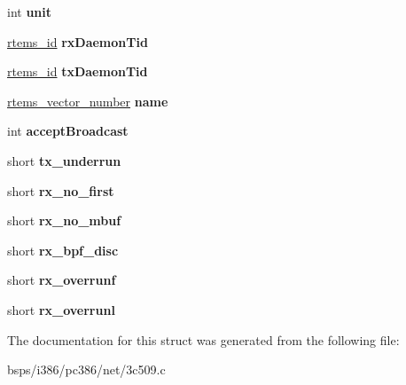 \begin{DoxyCompactItemize}
int {\bfseries unit}
\item 
\mbox{\label{structep__softc_a9312cff1f9c72f3cd36fba9ff84060f1}} 
\mbox{\hyperlink{group__ClassicTasks_gab20892b814dced7dd4e5b9bf42becd57}{rtems\+\_\+id}} {\bfseries rx\+Daemon\+Tid}
\item 
\mbox{\label{structep__softc_a6ae1c20341a00b1c6193d1e1e1aec3d4}} 
\mbox{\hyperlink{group__ClassicTasks_gab20892b814dced7dd4e5b9bf42becd57}{rtems\+\_\+id}} {\bfseries tx\+Daemon\+Tid}
\item 
\mbox{\label{structep__softc_a0ae1631a86900e353666d04e1480dda5}} 
\mbox{\hyperlink{group__ClassicINTR_ga3e434c197d99f128e78cae4d9358bd8b}{rtems\+\_\+vector\+\_\+number}} {\bfseries name}
\item 
\mbox{\label{structep__softc_af455c8a3900a4faeee5fc7903b1b10f5}} 
int {\bfseries accept\+Broadcast}
\item 
\mbox{\label{structep__softc_aae0d1ae24d23fe6b7633f567c977a359}} 
short {\bfseries tx\+\_\+underrun}
\item 
\mbox{\label{structep__softc_a5802aefc65ad704ba3d406cbb27b3261}} 
short {\bfseries rx\+\_\+no\+\_\+first}
\item 
\mbox{\label{structep__softc_a93d489a860df764881fcb7f5ed2d3e57}} 
short {\bfseries rx\+\_\+no\+\_\+mbuf}
\item 
\mbox{\label{structep__softc_a4253aeb7366f1e916650decc524c6bb5}} 
short {\bfseries rx\+\_\+bpf\+\_\+disc}
\item 
\mbox{\label{structep__softc_a8f67746cc1c6c3db2443db2f72e9918b}} 
short {\bfseries rx\+\_\+overrunf}
\item 
\mbox{\label{structep__softc_aa70d095f534cc7eded75d6d69f70bdce}} 
short {\bfseries rx\+\_\+overrunl}
\end{DoxyCompactItemize}


The documentation for this struct was generated from the following file\+:\begin{DoxyCompactItemize}
\item 
bsps/i386/pc386/net/3c509.\+c\end{DoxyCompactItemize}
